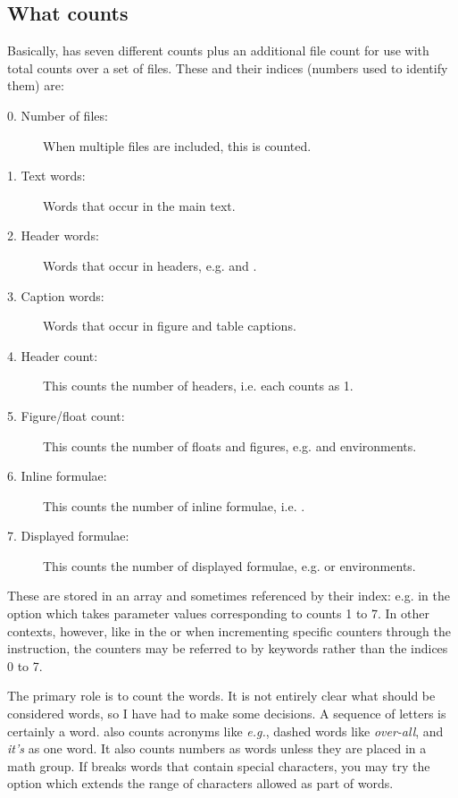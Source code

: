 \documentclass{article}
\begin{document}
\subsection{What \TeXcount{} counts}

Basically, \TeXcount{} has seven different counts plus an additional file count for use with total counts over a set of files. These and their indices (numbers used to identify them) are:
\begin{description}
\item[0. Number of files:] When multiple files are included, this is counted.
\item[1. Text words:] Words that occur in the main text.
\item[2. Header words:] Words that occur in headers, e.g.  and .
\item[3. Caption words:] Words that occur in figure and table captions.
\item[4. Header count:] This counts the number of headers, i.e. each  counts as 1.
\item[5. Figure/float count:] This counts the number of floats and figures, e.g.  and  environments.
\item[6. Inline formulae:] This counts the number of inline formulae, i.e. \code{\$\ldots\$}.
\item[7. Displayed formulae:] This counts the number of displayed formulae, e.g. \code{\bs{[}\ldots\bs{]}} or  environments.
\end{description}
These are stored in an array and sometimes referenced by their index: e.g. in the option  which takes parameter values corresponding to counts 1 to 7. In other contexts, however, like in the  or when incrementing specific counters through the  instruction, the counters may be referred to by keywords rather than the indices 0 to 7.

The primary role is to count the words. It is not entirely clear what should be considered words, so I have had to make some decisions. A sequence of letters is certainly a word. \TeXcount{} also counts acronyms like \textit{e.g.}, dashed words like \textit{over-all}, and \textit{it's} as one word. It also counts numbers as words unless they are placed in a math group. If \TeXcount{} breaks words that contain special characters, you may try the option  which extends the range of characters allowed as part of words.
\end{document}
